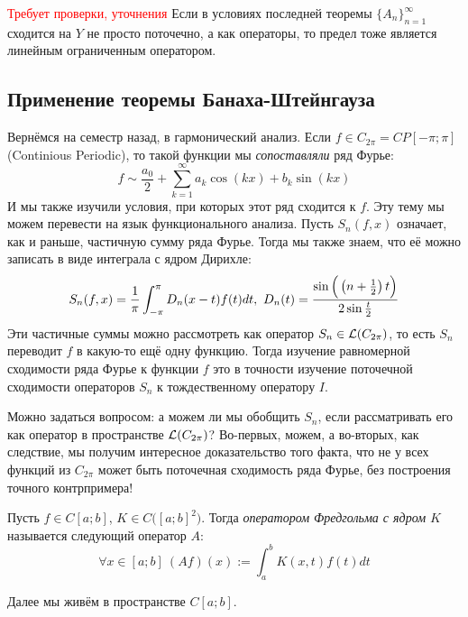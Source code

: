 \begin{corollary} \textcolor{red}{Требует проверки, уточнения}
	Если в условиях последней теоремы $\{A_n\}_{n = 1}^\infty$ сходится на $Y$ не просто поточечно, а как операторы, то предел тоже является линейным ограниченным оператором.
\end{corollary}

\subsection*{Применение теоремы Банаха-Штейнгауза}

\begin{problem}
	Вернёмся на семестр назад, в гармонический анализ. Если $f \in C_{2\pi} = CP[-\pi; \pi]$ (Continious Periodic), то такой функции мы \textit{сопоставляли} ряд Фурье:
	\[
		f \sim \frac{a_0}{2} + \sum_{k = 1}^\infty a_k\cos(kx) + b_k\sin(kx)
	\]
	И мы также изучили условия, при которых этот ряд сходится к $f$. Эту тему мы можем перевести на язык функционального анализа. Пусть $S_n(f, x)$ означает, как и раньше, частичную сумму ряда Фурье. Тогда мы также знаем, что её можно записать в виде интеграла с ядром Дирихле:
	\[
		S_n(f, x) = \frac{1}{\pi}\int_{-\pi}^\pi D_n(x - t)f(t)dt,\ D_n(t) = \frac{\sin\Big(\left(n + \frac{1}{2}\right)t\Big)}{2\sin\frac{t}{2}}
	\]
	Эти частичные суммы можно рассмотреть как оператор $S_n \in \mathcal{L}(C_{2\pi})$, то есть $S_n$ переводит $f$ в какую-то ещё одну функцию. Тогда изучение равномерной сходимости ряда Фурье к функции $f$ это в точности изучение поточечной сходимости операторов $S_n$ к тождественному оператору $I$.
	
	Можно задаться вопросом: а можем ли мы обобщить $S_n$, если рассматривать его как оператор в пространстве $\mathcal{L}(C_{2\pi})$? Во-первых, можем, а во-вторых, как следствие, мы получим интересное доказательство того факта, что не у всех функций из $C_{2\pi}$ может быть поточечная сходимость ряда Фурье, без построения точного контрпримера!
\end{problem}

\begin{definition}
	Пусть $f \in C[a; b]$, $K \in C\big([a; b]^2\big)$. Тогда \textit{оператором Фредгольма с ядром $K$} называется следующий оператор $A$:
	\[
		\forall x \in [a; b]\ (Af)(x) := \int_a^b K(x, t)f(t)dt
	\]
\end{definition}

\begin{note}
	Далее мы живём в пространстве $C[a; b]$.
\end{note}

